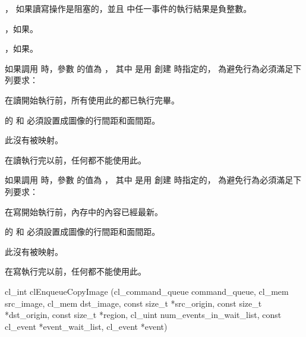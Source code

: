 \item {}，
如果讀寫操作是阻塞的，並且  中任一事件的執行結果是負整數。

\item {}，如果\scdevfailres。
\item {}，如果\schostfailres。
\stopigBase

\startnotepar%
如果調用  時，參數  的值為
，
其中  是用  創建  時指定的，
為避免行為必須滿足下列要求：
\startigBase
\item 在讀開始執行前，所有使用此的都已執行完畢。

\item {} 的  和 
必須設置成圖像的行間距和面間距。

\item 此沒有被映射。

\item 在讀執行完以前，任何都不能使用此。
\stopigBase

如果調用  時，參數  的值為
，
其中  是用  創建  時指定的，
為避免行為必須滿足下列要求：
\startigBase
\item 在寫開始執行前，內存中的內容已經最新。

\item {} 的 
和  必須設置成圖像的行間距和面間距。

\item 此沒有被映射。

\item 在寫執行完以前，任何都不能使用此。
\stopigBase
\stopnotepar%


\startCLFUNC
cl_int clEnqueueCopyImage (cl_command_queue command_queue,
			cl_mem src_image,
			cl_mem dst_image,
			const size_t *src_origin,
			const size_t *dst_origin,
			const size_t *region,
			cl_uint num_events_in_wait_list,
			const cl_event *event_wait_list,
			cl_event *event)
\stopCLFUNC

